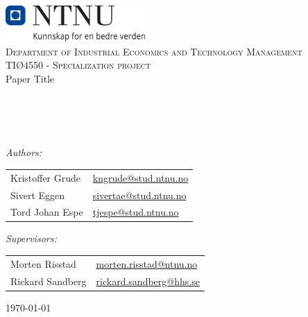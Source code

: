 \begin{titlepage}

\vbox{ }

\vbox{ }

\begin{center}
\includegraphics[width=0.40\textwidth]{Images/NTNU_logo.png}\\[1cm]
\textsc{\LARGE Department of Industrial Economics and Technology Management}\\[1.0cm]

\textsc{\Large TIØ4550 - Specialization project}\\[0.5cm]


\def\checktitle{Paper Title}
\ifx\TITLE\checktitle
\fi

\vbox{ }
\HRule \\[0.4cm]
{ \huge \bfseries \TITLE }\\[0.4cm]
\HRule \\[1.5cm]
\large


\emph{Authors:}\\
\begin{center}
\begin{tabular}{>{\raggedright}p{4cm} p{4cm}}  
    Kristoffer Grude & \href{mailto:kngrude@stud.ntnu.no}{kngrude@stud.ntnu.no} \\
    Sivert Eggen & \href{mailto:sivertae@stud.ntnu.no}{sivertae@stud.ntnu.no} \\
    Tord Johan Espe & \href{mailto:tjespe@stud.ntnu.no}{tjespe@stud.ntnu.no} \\
\end{tabular}
\end{center}

\emph{Supervisors:}\\
\begin{center}
\small  %
\begin{tabular}{>{\raggedright}p{4cm} p{4cm}}  
    Morten Risstad & \href{mailto:morten.risstad@ntnu.no}{morten.risstad@ntnu.no} \\
    Rickard Sandberg & \href{mailto:rickard.sandberg@hhs.se}{rickard.sandberg@hhs.se} \\
\end{tabular}
\end{center}


\vfill
{\large \today}
\end{center}
\end{titlepage}








